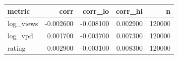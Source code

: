 \begin{tabular}{lrrrr}
\toprule
metric & corr & corr_lo & corr_hi & n \\
\midrule
log_views & -0.002600 & -0.008100 & 0.002900 & 120000 \\
log_vpd & 0.001700 & -0.003700 & 0.007300 & 120000 \\
rating & 0.002900 & -0.003100 & 0.008300 & 120000 \\
\bottomrule
\end{tabular}
